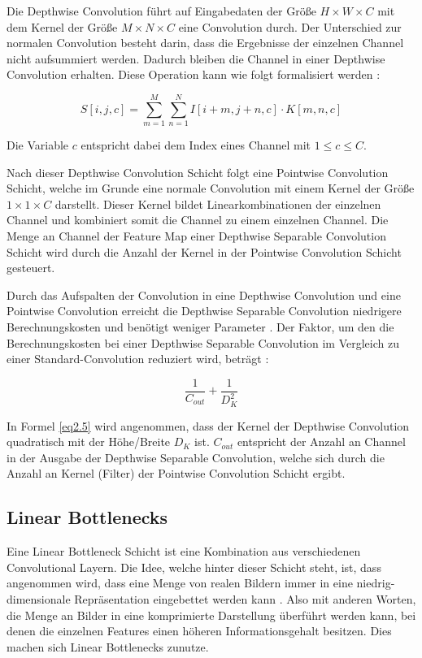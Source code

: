Die Depthwise Convolution führt auf Eingabedaten der Größe $H \times W \times C$ mit dem Kernel der Größe $M \times N \times C$ eine Convolution durch. Der Unterschied zur normalen Convolution besteht darin, dass die Ergebnisse der einzelnen Channel nicht aufsummiert werden. Dadurch bleiben die Channel in einer Depthwise Convolution erhalten. Diese Operation kann wie folgt formalisiert werden \cite{howard_mobilenets_2017}:

\begin{equation}
S[i, j, c] = \sum_{m=1}^{M} \sum_{n=1}^{N} I[i+m, j+n, c] \cdot K[m, n, c]
\label{eq2.4}
\end{equation}

Die Variable $c$ entspricht dabei dem Index eines Channel mit $1 \leq c \leq C$.

Nach dieser Depthwise Convolution Schicht folgt eine Pointwise Convolution Schicht, welche im Grunde eine normale Convolution mit einem Kernel der Größe $1 \times 1 \times C$ darstellt. Dieser Kernel bildet Linearkombinationen der einzelnen Channel und kombiniert somit die Channel zu einem einzelnen Channel. Die Menge an Channel der Feature Map einer Depthwise Separable Convolution Schicht wird durch die Anzahl der Kernel in der Pointwise Convolution Schicht gesteuert.

Durch das Aufspalten der Convolution in eine Depthwise Convolution und eine Pointwise Convolution erreicht die Depthwise Separable Convolution niedrigere Berechnungskosten und benötigt weniger Parameter \cite{howard_mobilenets_2017}. Der Faktor, um den die Berechnungskosten bei einer Depthwise Separable Convolution im Vergleich zu einer Standard-Convolution reduziert wird, beträgt \cite{howard_mobilenets_2017}:

\begin{equation}
\frac{1}{C_{out}} + \frac{1}{D_K^2}
\label{eq2.5}
\end{equation}

In Formel \ref{eq2.5} wird angenommen, dass der Kernel der Depthwise Convolution quadratisch mit der Höhe/Breite $D_K$ ist. $C_{out}$ entspricht der Anzahl an Channel in der Ausgabe der Depthwise Separable Convolution, welche sich durch die Anzahl an Kernel (Filter) der Pointwise Convolution Schicht ergibt.


\subsection{Linear Bottlenecks}
\label{linear_bottlenecks}
Eine Linear Bottleneck Schicht ist eine Kombination aus verschiedenen Convolutional Layern. Die Idee, welche hinter dieser Schicht steht, ist, dass angenommen wird, dass eine Menge von realen Bildern immer in eine niedrig-dimensionale Repräsentation eingebettet werden kann \cite{sandler_mobilenetv2_2019}. Also mit anderen Worten, die Menge an Bilder in eine komprimierte Darstellung überführt werden kann, bei denen die einzelnen Features einen höheren Informationsgehalt besitzen. Dies machen sich Linear Bottlenecks zunutze. 

